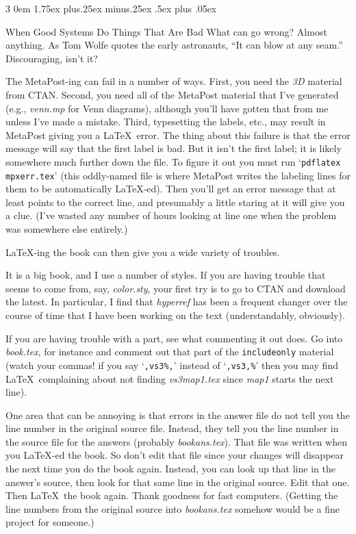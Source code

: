 \documentclass[titlepage]{article}
\makeatletter
\renewcommand{\subsubsection}{\@startsection{subsubsection}%
  {3}%
  {0em}%
  {1.75ex plus.25ex minus.25ex}%
  {.5ex plus .05ex}%
  {\bfseries\raggedright}}
\makeatother
\begin{document}
\subsubsection{When Good Systems Do Things That Are Bad}
What can go wrong?   
Almost anything.
As Tom Wolfe quotes the early astronauts, ``It can blow at any seam.''
Discouraging, isn't it?

The MetaPost-ing can fail in a number of ways.
First, you need the \textit{3D} material from CTAN.
Second, you need all of the MetaPost material that I've generated
(e.g., \textit{venn.mp} for Venn diagrams), although
you'll have gotten that from me unless I've made a mistake.
Third, typesetting the labels, etc., may result in MetaPost 
giving you a \LaTeX\ error.
The thing about this failure is that the error message 
will say that the first label is bad.
But it isn't the first label; it is likely somewhere much further
down the file.
To figure it out you must run 
`\verb!pdflatex mpxerr.tex!' (this oddly-named file is where MetaPost writes
the labeling lines for them to be automatically \LaTeX-ed).
Then you'll get an error message that at least points to the correct line,
and presumably a little staring at it will give you a clue.
(I've wasted any number of hours looking at line one when the 
problem was somewhere else entirely.)  

\LaTeX-ing the book can then give you a wide variety of
troubles.

It is a big book, and I use a number of styles.
If you are having trouble that seems to come from, say, \textit{color.sty},
your first try is to go to CTAN and download the latest.
In particular, I find that \textit{hyperref} has been a frequent
changer over the course of time that I have been working on the
text (understandably, obviously).

If you are having trouble with a part, see what commenting it out does.
Go into \textit{book.tex}, for instance and comment out that 
part of the \verb!includeonly! material (watch your commas! if you
say `\verb!,vs3%,!' instead of `\verb!,vs3,%!' then you may find 
\LaTeX\ complaining about
not finding \textit{vs3map1.tex} since \textit{map1} starts
the next line).

One area that can be annoying is that errors in the answer file do not
tell you the line number in the original source file.
Instead, they tell you the line number in the source file for the answers
(probably \textit{bookans.tex}).
That file was written when you \LaTeX-ed the book.
So don't edit that file since your changes will disappear the next time
you do the book again.
Instead, you can look up that line in the answer's source,
then look for that same line in the original source.
Edit that one.
Then \LaTeX\ the book again.
Thank goodness for fast computers.
(Getting the line numbers from the original source into \textit{bookans.tex} 
somehow would be a fine project for someone.)
\end{document}
